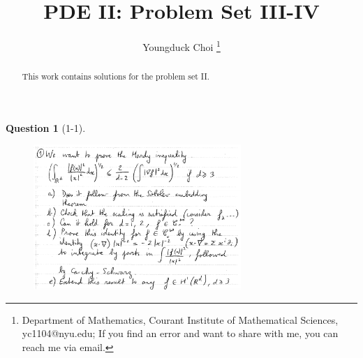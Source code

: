\documentclass[11pt]{article}
\date{}
\title{\vspace{-0.7cm}
PDE II: Problem Set III-IV}
\author{
Youngduck Choi 
\thanks{Department of Mathematics, Courant Institute of Mathematical Sciences, 
yc1104@nyu.edu; If you find an error and want to share with me, 
you can reach me via email.
}}
\theoremstyle{plain}
\theoremstyle{quest}
\newtheorem*{question}{Question}
\begin{document}
\maketitle

\begin{abstract}
This work contains solutions for the problem set II.
\end{abstract}


\begin{question}[1-1]
\hfill
\begin{figure}[h!]
  \centering
    \includegraphics[width=0.7\textwidth]{pde2-s34-p1.png}
\end{figure}
\end{question}
\end{document}
